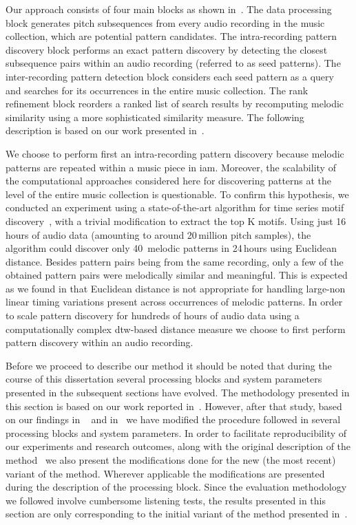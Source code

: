 Our approach consists of four main blocks as shown in~. The data processing block generates pitch subsequences from every audio recording in the music collection, which are potential pattern candidates. The intra-recording pattern discovery block performs an exact pattern discovery by detecting the closest subsequence pairs within an audio recording (referred to as seed patterns). The inter-recording pattern detection block considers each seed pattern as a query and searches for its occurrences in the entire music collection. The rank refinement block reorders a ranked list of search results by recomputing melodic similarity using a more sophisticated similarity measure. The following description is based on our work presented in~\cite{gulati_SITIS_2014}.

We choose to perform first an intra-recording pattern discovery because melodic patterns are repeated within a music piece in \gls{iam}. Moreover, the scalability of the computational approaches considered here for discovering patterns at the level of the entire music collection is questionable. To confirm this hypothesis, we conducted an experiment using a state-of-the-art algorithm for time series motif discovery~\citep{Mueen2009}, with a trivial modification to extract the top K motifs. Using just 16\,hours of audio data (amounting to around 20\,million pitch samples), the algorithm could discover only 40~melodic patterns in 24\,hours using Euclidean distance. Besides pattern pairs being from the same recording, only a few of the obtained pattern pairs were melodically similar and meaningful. This is expected as we found in  that Euclidean distance is not appropriate for handling large-non linear timing variations present across occurrences of melodic patterns. In order to scale pattern discovery for hundreds of hours of audio data using a computationally complex \gls{dtw}-based distance measure we choose to first perform pattern discovery within an audio recording.

Before we proceed to describe our method it should be noted that during the course of this dissertation several processing blocks and system parameters presented in the subsequent sections have evolved. The methodology presented in this section is based on our work reported in~\cite{gulati_SITIS_2014}. However, after that study, based on our findings in ~\cite{gulati_ICASSP2015} and in~\cite{gulati_ICASSP2015} we have modified the procedure followed in several processing blocks and system parameters. In order to facilitate reproducibility of our experiments and research outcomes, along with the original description of the method~\citep{gulati_SITIS_2014} we also present the modifications done for the new (the most recent) variant of the method. Wherever applicable the modifications are presented during the description of the processing block. Since the evaluation methodology we followed involve cumbersome listening tests, the results presented in this section are only corresponding to the initial variant of the method presented in~\cite{gulati_SITIS_2014}.


